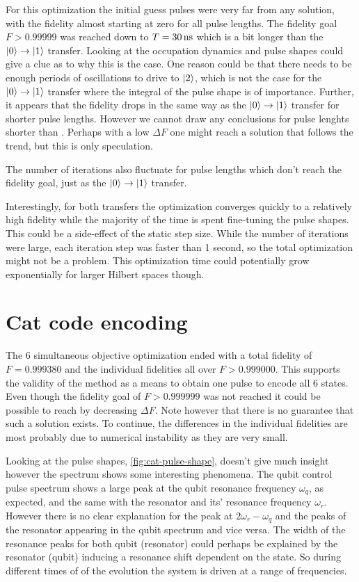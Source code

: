 \documentclass[main.tex]{subfiles}
\begin{document}
For this optimization the initial guess pulses were very far from any solution, with the fidelity almost starting at zero for all pulse lengths.
The fidelity goal \(F > 0.99999\) was reached down to \(T = \SI{30}{\nano\second}\) which is a bit longer than the \(\ket{0}\rightarrow\ket{1}\) transfer.
Looking at the occupation dynamics and pulse shapes could give a clue as to why this is the case.
One reason could be that there needs to be enough periods of oscillations to drive to \(\ket{2}\), which is not the case for the \(\ket{0}\rightarrow\ket{1}\) transfer where the integral of the pulse shape is of importance.
Further, it appears that the fidelity drops in the same way as the \(\ket{0}\rightarrow\ket{1}\) transfer for shorter pulse lengths.
However we cannot draw any conclusions for pulse lenghts shorter than .
Perhaps with a low \(\Delta F\) one might reach a solution that follows the trend, but this is only speculation.

The number of iterations also fluctuate for pulse lengths which don't reach the fidelity goal, just as the \(\ket{0}\rightarrow\ket{1}\) transfer.

Interestingly, for both transfers the optimization converges quickly to a relatively high fidelity while the majority of the time is spent fine-tuning the pulse shapes.
This could be a side-effect of the static step size.
While the number of iterations were large, each iteration step was faster than 1 second, so the total optimization might not be a problem.
This optimization time could potentially grow exponentially for larger Hilbert spaces though.

\section{Cat code encoding}
The 6 simultaneous objective optimization ended with a total fidelity of \(F = 0.999380\) and the individual fidelities all over \(F > 0.999000\).
This supports the validity of the method as a means to obtain one pulse to encode all 6 states.
Even though the fidelity goal of \(F > 0.999999\) was not reached it could be possible to reach by decreasing \(\Delta F\).
Note however that there is no guarantee that such a solution exists.
To continue, the differences in the individual fidelities are most probably due to numerical instability as they are very small.

Looking at the pulse shapes, \cref{fig:cat-pulse-shape}, doesn't give much insight however the spectrum shows some interesting phenomena.
The qubit control pulse spectrum shows a large peak at the qubit resonance frequency \(\omega_q\), as expected, and the same with the resonator and its' resonance frequency \(\omega_r\).
However there is no clear explanation for the peak at \(2\omega_r-\omega_q\) and the peaks of the resonator appearing in the qubit spectrum and vice versa.
The width of the resonance peaks for both qubit (resonator) could perhaps be explained by the resonator (qubit) inducing a resonance shift dependent on the state.
So during different times of of the evolution the system is driven at a range of frequencies.

\end{document}
